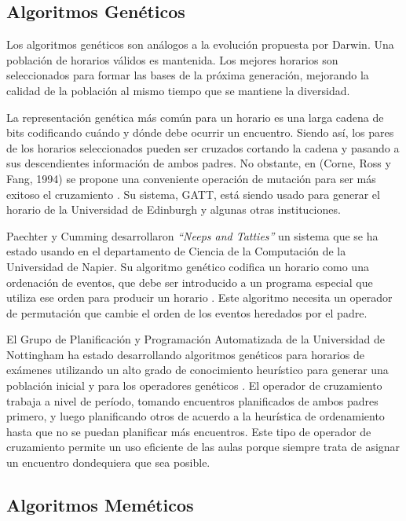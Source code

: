 \subsection{Algoritmos Genéticos}

Los algoritmos genéticos son análogos a la evolución propuesta por Darwin. Una población de horarios válidos
es mantenida. Los mejores horarios son seleccionados para formar las bases de la próxima generación, mejorando
la calidad de la población al mismo tiempo que se mantiene la diversidad.

La representación genética más común para un horario es una larga cadena de bits codificando cuándo y dónde
debe ocurrir un encuentro. Siendo así, los pares de los horarios seleccionados pueden ser cruzados cortando
la cadena y pasando a sus descendientes información de ambos padres. No obstante, en (Corne, Ross y Fang, 1994) se propone una conveniente operación de mutación para ser más exitoso el cruzamiento \cite{D Corne and P Ross and HL Fang}. Su sistema, GATT, está siendo usado para generar el horario de la Universidad de Edinburgh y algunas otras
instituciones.

Paechter y Cumming desarrollaron \emph{``Neeps and Tatties''} un sistema que se ha estado usando en el departamento
de Ciencia de la Computación de la Universidad de Napier. Su algoritmo genético codifica un horario como una ordenación
de eventos, que debe ser introducido a un programa especial que utiliza ese orden para producir un horario
\cite{B Paechter* and A Cumming* and H Luchian}. Este algoritmo necesita un operador de permutación 
que cambie el orden de los eventos heredados por el padre.

El Grupo de Planificación y Programación Automatizada de la Universidad de Nottingham ha estado desarrollando
algoritmos genéticos para horarios de exámenes utilizando un alto grado de conocimiento heurístico para generar
una población inicial y para los operadores genéticos \cite{EK Burke and DG Elliman and RF Weare 1, 
EK Burke and DG Elliman and RF Weare 2, EK Burke and DG Elliman and RF Weare 3}. El operador de cruzamiento
trabaja a nivel de período, tomando encuentros planificados de ambos padres primero, y luego planificando
otros de acuerdo a la heurística de ordenamiento hasta que no se puedan planificar más encuentros. Este tipo de operador de cruzamiento permite un uso eficiente de las aulas porque siempre trata de asignar un encuentro dondequiera que sea posible.

\subsection{Algoritmos Mem\'eticos}

